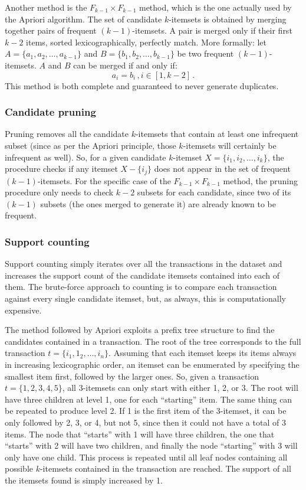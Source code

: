 Another method is the $F_{k-1} \times F_{k-1}$ method, which is the one actually used by the Apriori algorithm. The set of candidate $k$-itemsets is obtained by merging together pairs of frequent $(k-1)$-itemsets. A pair is merged only if their first $k-2$ items, sorted lexicographically, perfectly match. More formally: let $A = \{ a_1, a_2, \dots, a_{k-1} \}$ and $B = \{ b_1, b_2, \dots, b_{k-1} \}$ be two frequent $(k-1)$-itemsets. $A$ and $B$ can be merged if and only if:
\begin{equation*}
    a_i = b_i \,, i \in [1,k-2] \,.
\end{equation*}
This method is both complete and guaranteed to never generate duplicates.

\subsubsection{Candidate pruning}

Pruning removes all the candidate $k$-itemsets that contain at least one infrequent subset (since as per the Apriori principle, those $k$-itemsets will certainly be infrequent as well). So, for a given candidate $k$-itemset $X = \{ i_1, i_2, \dots, i_k \}$, the procedure checks if any itemset $X - \{i_j\}$ does not appear in the set of frequent $(k-1)$-itemsets. For the specific case of the $F_{k-1} \times F_{k-1}$ method, the pruning procedure only needs to check $k-2$ subsets for each candidate, since two of its $(k-1)$ subsets (the ones merged to generate it) are already known to be frequent.

\subsubsection{Support counting} 

Support counting simply iterates over all the transactions in the dataset and increases the support count of the candidate itemsets contained into each of them. The brute-force approach to counting is to compare each transaction against every single candidate itemset, but, as always, this is computationally expensive.

The method followed by Apriori exploits a prefix tree structure to find the candidates contained in a transaction. The root of the tree corresponds to the full transaction $t = \{ i_1, 1_2, \dots, i_n \}$. Assuming that each itemset keeps its items always in increasing lexicographic order, an itemset can be enumerated by specifying the smallest item first, followed by the larger ones. So, given a transaction $t = \{ 1, 2, 3, 4, 5 \}$, all 3-itemsets can only start with either 1, 2, or 3. The root will have three children at level 1, one for each ``starting'' item. The same thing can be repeated to produce level 2. If 1 is the first item of the 3-itemset, it can be only followed by 2, 3, or 4, but not 5, since then it could not have a total of 3 items. The node that ``starts'' with 1 will have three children, the one that ``starts'' with 2 will have two children, and finally the node ``starting'' with 3 will only have one child. This process is repeated until all leaf nodes containing all possible $k$-itemsets contained in the transaction are reached. The support of all the itemsets found is simply increased by 1.

